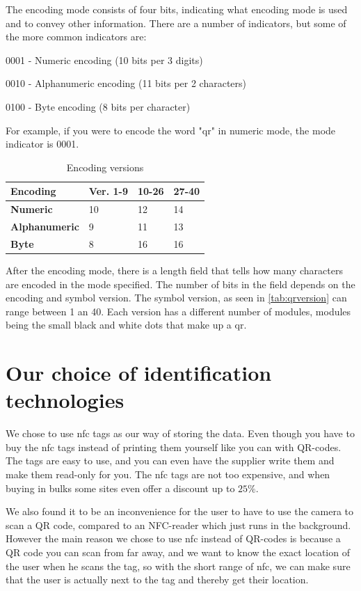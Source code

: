 The encoding mode consists of four bits, indicating what encoding mode is used and to convey other information. There are a number of indicators, but some of the more common indicators are:

\begin{description}
\item 0001 - Numeric encoding (10 bits per 3 digits)
\item 0010 - Alphanumeric encoding (11 bits per 2 characters)
\item 0100 - Byte encoding (8 bits per character)
\end{description}

For example, if you were to encode the word "\ac{qr}" in numeric mode, the mode indicator is 0001.

\begin{table}[H]
\centering
\begin{tabular}{|l|l|l|l|}
\hline
\textbf{Encoding} & \textbf{Ver. 1-9} & \textbf{10-26} & \textbf{27-40} \\
\hline
\textbf{Numeric } & 10 & 12 & 14  \\
\hline
\textbf{Alphanumeric} & 9 & 11 & 13 \\
\hline
\textbf{Byte} & 8 & 16 & 16 \\
\hline
\end{tabular}
\caption{Encoding versions}
\label{tab:qrversion}
\end{table}

After the encoding mode, there is a length field that tells how many characters are encoded in the mode specified. The number of bits in the field depends on the encoding and symbol version\citep{qrcode1}. The symbol version, as seen in \autoref{tab:qrversion} can range between 1 an 40. Each version has a different number of modules, modules being the small black and white dots that make up a \ac{qr}\citep{qrversion}. 

\section{Our choice of identification technologies}
We chose to use \ac{nfc} tags as our way of storing the data. Even though you have to buy the \ac{nfc} tags instead of printing them yourself like you can with QR-codes. The tags are easy to use, and you can even have the supplier write them and make them read-only for you. The \ac{nfc} tags are not too expensive, and when buying in bulks some sites even offer a discount up to $25\%$\citep{nfczonen}. 

We also found it to be an inconvenience for the user to have to use the camera to scan a QR code, compared to an NFC-reader which just runs in the background. However the main reason we chose to use \ac{nfc} instead of QR-codes is because a QR code you can scan from far away, and we want to know the exact location of the user when he scans the tag, so with the short range of \ac{nfc}, we can make sure that the user is actually next to the tag and thereby get their location.